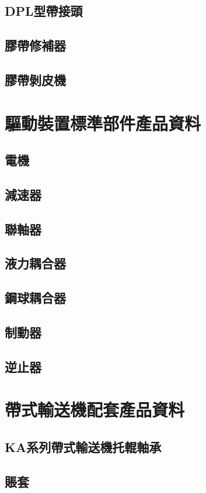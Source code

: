 \documentclass[UTF8]{ctexart}
\begin{document}
\subsection{DPL型帶接頭}
\subsection{膠帶修補器}
\subsection{膠帶剝皮機}




\newpage
\section{驅動裝置標準部件產品資料}
\subsection{電機}
\subsection{減速器}
\subsection{聯軸器}
\subsection{液力耦合器}
\subsection{鋼球耦合器}
\subsection{制動器}
\subsection{逆止器}




\newpage
\section{帶式輸送機配套產品資料}
\subsection{KA系列帶式輸送機托輥軸承}
\subsection{賬套}
\end{document}
